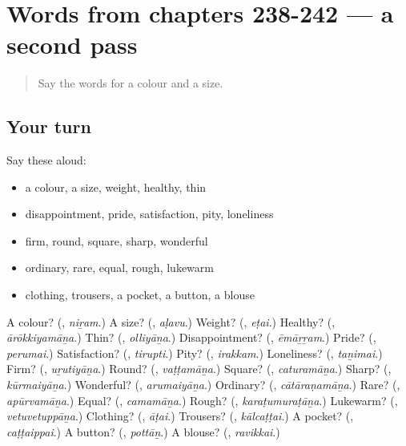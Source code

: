 \section[(dialogue)]{Words from chapters 238-242 — a second pass}

\label{lesson:TA-R242-second-pass-words-from-chapters-238-242}



\begin{quote}
Say the words for a colour and a size.
\end{quote}

\subsection*{Your turn}
Say these aloud:

\begin{itemize}
\raggedright
  \item a colour, a size, weight, healthy, thin
  \item disappointment, pride, satisfaction, pity, loneliness
  \item firm, round, square, sharp, wonderful
  \item ordinary, rare, equal, rough, lukewarm
  \item clothing, trousers, a pocket, a button, a blouse
\end{itemize}

\begin{tcolorbox}[breakable,colback=teal!4,colframe=teal!35!black,title={Before you move on}]
A colour? (\textbf{}, \emph{niṟam}.) A size? (\textbf{}, \emph{aḷavu}.) Weight? (\textbf{}, \emph{eṭai}.) Healthy? (\textbf{}, \emph{ārōkkiyamāṉa}.) Thin? (\textbf{}, \emph{olliyāṉa}.) Disappointment? (\textbf{}, \emph{ēmāṟṟam}.) Pride? (\textbf{}, \emph{perumai}.) Satisfaction? (\textbf{}, \emph{tirupti}.) Pity? (\textbf{}, \emph{irakkam}.) Loneliness? (\textbf{}, \emph{taṉimai}.) Firm? (\textbf{}, \emph{uṟutiyāṉa}.) Round? (\textbf{}, \emph{vaṭṭamāṉa}.) Square? (\textbf{}, \emph{caturamāṉa}.) Sharp? (\textbf{}, \emph{kūrmaiyāṉa}.) Wonderful? (\textbf{}, \emph{arumaiyāṉa}.) Ordinary? (\textbf{}, \emph{cātāraṇamāṉa}.) Rare? (\textbf{}, \emph{apūrvamāṉa}.) Equal? (\textbf{}, \emph{camamāṉa}.) Rough? (\textbf{}, \emph{karaṭumuraṭāṉa}.) Lukewarm? (\textbf{}, \emph{vetuvetuppāṉa}.) Clothing? (\textbf{}, \emph{āṭai}.) Trousers? (\textbf{}, \emph{kālcaṭṭai}.) A pocket? (\textbf{}, \emph{caṭṭaippai}.) A button? (\textbf{}, \emph{pottāṉ}.) A blouse? (\textbf{}, \emph{ravikkai}.)
\end{tcolorbox}
